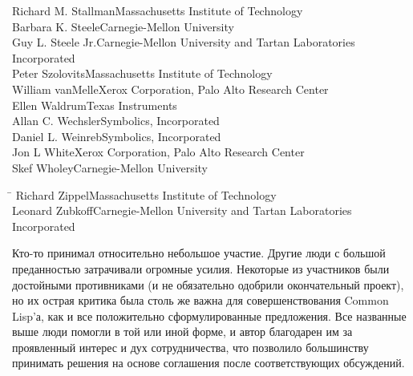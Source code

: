 \begin{tabbing}
Richard M. Stallman\>Massachusetts Institute of Technology \\
Barbara K. Steele\>Carnegie-Mellon University \\
Guy L. Steele Jr.\>Carnegie-Mellon University and Tartan Laboratories \\
                 \>Incorporated \\
Peter Szolovits\>Massachusetts Institute of Technology \\
William vanMelle\>Xerox Corporation, Palo Alto Research Center \\ Ellen
Waldrum\>Texas Instruments \\ Allan C. Wechsler\>Symbolics, Incorporated \\
Daniel L. Weinreb\>Symbolics, Incorporated \\
Jon L White\>Xerox Corporation, Palo Alto Research Center \\
Skef Wholey\>Carnegie-Mellon University
\end{tabbing}
\begin{tabbing}
\hskip8.5pc\=\kill
Richard Zippel\>Massachusetts Institute of Technology \\
Leonard Zubkoff\>Carnegie-Mellon University and Tartan Laboratories \\
               \>Incorporated
\end{tabbing}
Кто-то принимал относительно небольшое участие. Другие люди с большой
преданностью затрачивали огромные усилия. Некоторые из участников были
достойными противниками (и не обязательно одобрили окончательный проект), но их
острая критика была столь же важна для совершенствования Common Lisp'а, как и
все положительно сформулированные предложения. Все названные выше люди
помогли в той или иной форме, и автор благодарен им за проявленный интерес и дух
сотрудничества, что позволило большинству принимать решения на основе соглашения
после соответствующих обсуждений.

